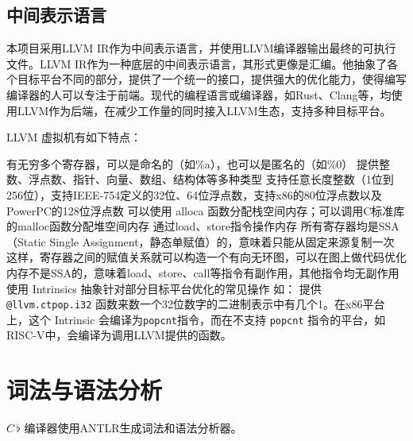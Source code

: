 \documentclass{ctexrep}
\newcommand{\cb}{$C\,\flat$\xspace}
\begin{document}
\subsection{中间表示语言}

本项目采用LLVM IR\cite{lattnerLLVMCompilationFramework2004}作为中间表示语言，并使用LLVM编译器输出最终的可执行文件。LLVM IR作为一种底层的中间表示语言，其形式更像是汇编。他抽象了各个目标平台不同的部分，提供了一个统一的接口，提供强大的优化能力，使得编写编译器的人可以专注于前端。现代的编程语言或编译器，如Rust、Clang等，均使用LLVM作为后端，在减少工作量的同时接入LLVM生态，支持多种目标平台。

LLVM 虚拟机有如下特点：
\begin{outline}[enumerate]
    \1 有无穷多个寄存器，可以是命名的（如\%a），也可以是匿名的（如\%0）
    \1 提供整数、浮点数、指针、向量、数组、结构体等多种类型
        \2 支持任意长度整数（1位到256位），支持IEEE-754定义的32位、64位浮点数，支持x86的80位浮点数以及PowerPC的128位浮点数
    \1 可以使用 alloca 函数分配栈空间内存；可以调用C标准库的malloc函数分配堆空间内存
    \1 通过load、store指令操作内存
    \1 所有寄存器均是SSA（Static Single Assignment，静态单赋值）的，意味着只能从固定来源复制一次
        \2 这样，寄存器之间的赋值关系就可以构造一个有向无环图，可以在图上做代码优化
        \2 内存不是SSA的，意味着load、store、call等指令有副作用，其他指令均无副作用
    \1 使用 Intrinsics 抽象针对部分目标平台优化的常见操作
        \2 如： 提供 \texttt{@llvm.ctpop.i32} 函数来数一个32位数字的二进制表示中有几个1。在x86平台上，这个 Intrinsic 会编译为\texttt{popcnt}指令，而在不支持 \texttt{popcnt} 指令的平台，如RISC-V中，会编译为调用LLVM提供的函数。
\end{outline}

\section{词法与语法分析}
\cb 编译器使用ANTLR生成词法和语法分析器。
\end{document}
